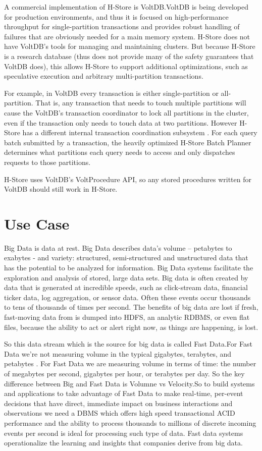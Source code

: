\documentclass[9pt,twocolumn,twoside]{styles/osajnl}
\begin{document}
A commercial implementation of H-Store is VoltDB.VoltDB is being developed for production environments, and thus it is focused on high-performance throughput for single-partition transactions and provides robust handling of failures that are obviously needed for a main memory system. H-Store does not have VoltDB’s tools for managing and maintaining clusters. But because H-Store is a research database (thus does not provide many of the safety guarantees that VoltDB does), this allows H-Store to support additional optimizations, such as speculative execution and arbitrary multi-partition transactions.

For example, in VoltDB every transaction is either single-partition or all-partition. That is, any transaction that needs to touch multiple partitions will cause the VoltDB’s transaction coordinator to lock all partitions in the cluster, even if the transaction only needs to touch data at two partitions. However H-Store has a different internal transaction coordination subsystem . For each query batch submitted by a transaction, the heavily optimized H-Store Batch Planner determines what partitions each query needs to access and only dispatches requests to those partitions.

H-Store uses VoltDB’s VoltProcedure API, so any stored procedures written for VoltDB should still work in H-Store\cite{www-H-StoreFaq}. 


\section{Use Case}

Big Data is data at rest. Big Data describes data’s volume – petabytes to exabytes - and variety: structured, semi-structured and unstructured data that has the potential to be analyzed for information. Big Data systems facilitate the exploration and analysis of stored, large data sets.
Big data is often created by data that is generated at incredible speeds, such as click-stream data, financial ticker data, log aggregation, or sensor data. Often these events occur thousands to tens of thousands of times per second. The benefits of big data are lost if fresh, fast-moving data from  is dumped into HDFS, an analytic RDBMS, or even flat files, because the ability to act or alert right now, as things are happening, is lost. 

So this data stream which is the source for big data is called Fast Data.For Fast Data we're not measuring volume in the typical gigabytes, terabytes, and petabytes . For Fast Data we are measuring volume in terms of time: the number of megabytes per second, gigabytes per hour, or terabytes per day. So the key difference between Big and Fast Data is Volumne vs Velocity.So to build systems and applications to take advantage of Fast Data  to make real-time, per-event decisions that have direct, immediate impact on business interactions and observations we need a DBMS which  offers high speed transactional ACID performance and the ability to process thousands to millions of discrete incoming events per second is ideal for processing such type of data. Fast data systems operationalize the learning and insights that companies derive from big data.
\end{document}
